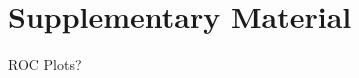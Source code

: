 \documentclass[12pt,a4paper]{article}\usepackage[]{graphicx}\usepackage[]{color}
\begin{document}
\pagebreak

\begingroup
{}
\setlength\bibitemsep{7pt}




\printbibliography
\endgroup

\pagebreak
\section{Supplementary Material}

ROC Plots?
\end{document}
